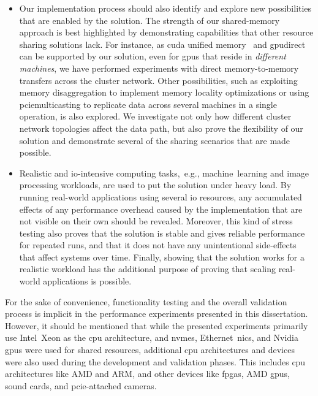 \begin{itemize}
    \item 
        Our implementation process should also identify and explore new possibilities that are enabled by the solution.
        The strength of our shared-memory approach is best highlighted by demonstrating capabilities that other resource sharing solutions lack.
        For instance, as \gls{cuda} unified memory~\cite{url:unified-memory} and \gls{gpudirect}~\cite{url:GPUDirect,url:Rosetti2014} can be supported by our solution, even for \glspl{gpu} that reside in \emph{different machines}, we have performed experiments with direct memory-to-memory transfers across the cluster network.
        Other possibilities, such as exploiting memory \gls{disaggregation} to implement memory locality optimizations or using \gls{pciemulticasting} to replicate data across several machines in a single operation, is also explored.
        We investigate not only how different cluster network topologies affect the data path, but also prove the flexibility of our solution and demonstrate several of the sharing scenarios that are made possible.

    \item
        Realistic and \gls{io}-intensive computing tasks,~e.g., machine~learning and image processing workloads, are used to put the solution under heavy load.
        By running real-world applications using several \gls{io} resources, any accumulated effects of any performance overhead caused by the implementation that are not visible on their own should be revealed.
        Moreover, this kind of stress testing also proves that the solution is stable and gives reliable performance for repeated runs, and that it does not have any unintentional side-effects that affect systems over time.
        Finally, showing that the solution works for a realistic workload has the additional purpose of proving that scaling real-world applications is possible.

\end{itemize}
%
For the sake of convenience, functionality testing and the overall validation process is implicit in the performance experiments presented in this dissertation.
%
However, it should be mentioned that while the presented experiments primarily use Intel~Xeon as the \gls{cpu} architecture, and \glspl{nvme}, Ethernet~\glspl{nic}, and Nvidia \glspl{gpu} were used for shared resources, additional \gls{cpu} architectures and devices were also used during the development and validation phases.
%
This includes \gls{cpu} architectures like AMD and ARM, and other devices like \glspl{fpga}, AMD \glspl{gpu}, sound cards, and \gls{pcie}-attached cameras.


